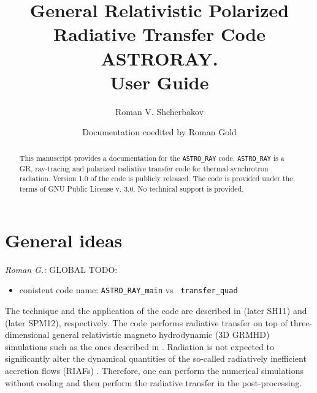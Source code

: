 \documentclass{emulateapj}
\newcommand{\rg}[1]{\color{blue}\textit{Roman G.:} #1\color{black}}
\begin{document}
\title{General Relativistic Polarized Radiative Transfer Code ASTRORAY. \\User Guide}

\author{Roman V. Shcherbakov}
\author{Documentation coedited by Roman Gold}


\setcounter{page}{1}


\begin{abstract}
This manuscript provides a documentation for the {\tt ASTRO\_RAY}
code. {\tt ASTRO\_RAY} is a GR, ray-tracing and polarized radiative
transfer code for thermal synchrotron radiation.
Version 1.0 of the code is publicly released.  The code is provided
under the terms of GNU Public License v. 3.0.  No technical support is
provided.
\end{abstract}



\section{General ideas}

\rg{GLOBAL TODO:
\begin{itemize}
  \item conistent code name: {\tt ASTRO\_RAY\_main} vs {\tt
    transfer\_quad}
\end{itemize}
}


The technique and the application of the code are described in
\citet{Shcherbakov:2011inter} (later SH11) and
\citet{Shcherbakov:2012appl} (later SPM12), respectively.  The code
performs radiative transfer on top of three-dimensional general
relativistic magneto hydrodynamic (3D GRMHD) simulations such as the
ones described in
\citet{Penna:2010dj,Tchekhovskoy:2011qp,McKinney2012,Narayan:2012dw}. Radiation
is not expected to significantly alter the dynamical quantities of the
so-called radiatively inefficient accretion flows (RIAFs)
\citep{Narayan:1998re,Quataert:2001op}. Therefore, one can perform the
numerical simulations without cooling and then perform the radiative
transfer in the post-processing.
\end{document}
